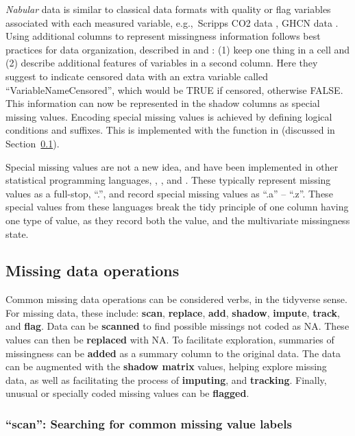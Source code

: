 \documentclass[article]{jss}
\begin{document}
\emph{Nabular} data is similar to classical data formats with quality or
flag variables associated with each measured variable, e.g.,~Scripps CO2
data \citep{Keeling2005-scripps}, GHCN data \citep{Durre2008-ghcn}.  Using
additional columns to represent missingness information follows best
practices for data organization, described in \citep{Ellis2018} and
\citep{Broman2018}: (1) keep one thing in a cell and (2) describe additional
features of variables in a second column.  Here they suggest to indicate
censored data with an extra variable called ``VariableNameCensored'', which
would be TRUE if censored, otherwise FALSE.  This information can now be
represented in the shadow columns as special missing values.  Encoding
special missing values is achieved by defining logical conditions and
suffixes.  This is implemented with the  function in
 (discussed in Section~\ref{verbs}).

Special missing values are not a new idea, and have been implemented in
other statistical programming languages, , ,
and .  These typically represent missing values as a
full-stop, ``.'', and record special missing values as ``.a'' -- ``.z''.
These special values from these languages break the tidy principle of one
column having one type of value, as they record both the value, and the
multivariate missingness state.

\hypertarget{verbs}{%
\subsection{Missing data operations}\label{verbs}}

Common missing data operations can be considered verbs, in the tidyverse
sense.  For missing data, these include: \textbf{scan}, \textbf{replace},
\textbf{add}, \textbf{shadow}, \textbf{impute}, \textbf{track}, and
\textbf{flag}.  Data can be \textbf{scanned} to find possible missings not
coded as NA.  These values can then be \textbf{replaced} with
NA.  To facilitate exploration, summaries of missingness can be
\textbf{added} as a summary column to the original data.  The data can be
augmented with the \textbf{shadow matrix} values, helping explore missing
data, as well as facilitating the process of \textbf{imputing}, and
\textbf{tracking}.  Finally, unusual or specially coded missing values can
be \textbf{flagged}.

\hypertarget{verbs-search}{%
\subsubsection{``scan'': Searching for common missing value labels}\label{verbs-search}}
\end{document}
